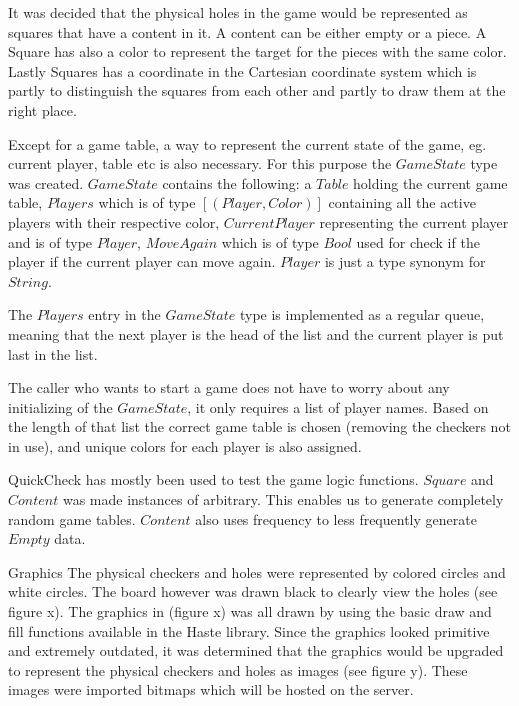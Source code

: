 \documentclass[a4paper]{article}
\begin{document}
It was decided that the physical holes in the game would be represented as squares that have a content in it. A content can be either empty or a piece. A Square has also a color to represent the target for the pieces with the same color. Lastly Squares has a coordinate in the Cartesian coordinate system which is partly to distinguish the squares from each other and partly to draw them at the right place.

Except for a game table, a way to represent the current state of the game, eg. current player, table etc is also necessary. For this purpose the $GameState$ type was created. $GameState$ contains the following: a $Table$ holding the current game table, $Players$ which is of type $[(Player,Color)]$ containing all the active players with their respective color, $CurrentPlayer$ representing the current player and is of type $Player$, $MoveAgain$ which is of type $Bool$ used for check if the player if the current player can move again. $Player$ is just a type synonym for $String$.

The $Players$ entry in the $GameState$ type is implemented as a regular queue, meaning that the next player is the head of the list and the current player is put last in the list. 

The caller who wants to start a game does not have to worry about any initializing of the $GameState$, it only requires a list of player names. Based on the length of that list the correct game table is chosen (removing the checkers not in use), and unique colors for each player is also assigned. 

QuickCheck has mostly been used to test the game logic functions. $Square$ and $Content$ was made instances of arbitrary. This enables us to generate completely random game tables. $Content$ also uses frequency to less frequently generate $Empty$ data. 



Graphics 
The physical checkers and holes were represented by colored circles and white circles. The board however was drawn black to clearly view the holes (see figure x). The graphics in (figure x) was all drawn by using the basic draw and fill functions available in the Haste library. Since the graphics looked primitive and extremely outdated, it was determined that the graphics would be upgraded to represent the physical checkers and holes as images (see figure y). These images were imported bitmaps which will be hosted on the server.
\end{document}
